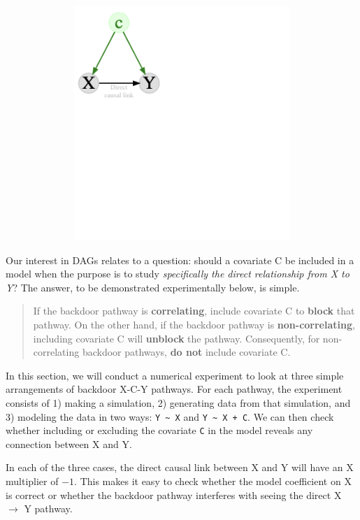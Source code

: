 \documentclass[
  letterpaper,
  DIV=11,
  numbers=noendperiod,
  oneside]{scrartcl}
\begin{document}
\includegraphics[width=5.5in,height=3.5in]{test-tufte_files/figure-latex/dot-figure-1.png}

Our interest in DAGs relates to a question: should a covariate C be
included in a model when the purpose is to study \emph{specifically the
direct relationship from X to Y}? The answer, to be demonstrated
experimentally below, is simple.

\begin{quote}
If the backdoor pathway is \textbf{correlating}, include covariate C to
\textbf{block} that pathway. On the other hand, if the backdoor pathway
is \textbf{non-correlating}, including covariate C will \textbf{unblock}
the pathway. Consequently, for non-correlating backdoor pathways,
\textbf{do not} include covariate C.
\end{quote}

In this section, we will conduct a numerical experiment to look at three
simple arrangements of backdoor X-C-Y pathways. For each pathway, the
experiment consists of 1) making a simulation, 2) generating data from
that simulation, and 3) modeling the data in two ways:
\texttt{Y\ \textasciitilde{}\ X} and
\texttt{Y\ \textasciitilde{}\ X\ +\ C}. We can then check whether
including or excluding the covariate \texttt{C} in the model reveals any
connection between X and Y.

In each of the three cases, the direct causal link between X and Y will
have an X multiplier of \(-1\). This makes it easy to check whether the
model coefficient on X is correct or whether the backdoor pathway
interferes with seeing the direct X \(\rightarrow\) Y pathway.
\end{document}
